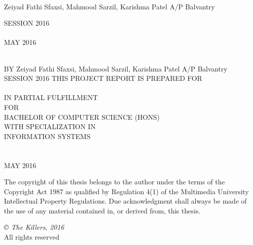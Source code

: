 \documentclass[12pt, oneside]{Thesis}
\begin{document}
\begin{titlepage}
\begin{center}

{\LARGE \ttitle}\\[0.4cm] 
\vfill
\Large{Zeiyad Fathi Sfaxsi, Mahmood Sarzil, Karishma Patel A/P Balvantry} 

\vfill
\normalsize{SESSION 2016}
\vfill
\normalsize\FACNAME\\
\normalsize \UNIVNAME\\
{\normalsize MAY 2016}\\ 
\vfill
\end{center}

\end{titlepage}
\thispagestyle{empty}
\begin{center}

	{\LARGE \ttitle}\\[0.4cm] %
	\vfill
	\footnotesize{BY}
	\vfill
	\Large{Zeiyad Fathi Sfaxsi, Mahmood Sarzil, Karishma Patel A/P Balvantry} %
	\vfill
	\footnotesize{SESSION 2016}
	\vfill
	\footnotesize{THIS PROJECT REPORT IS PREPARED FOR}
	\vfil
	\normalsize\FACNAME\\
	\normalsize \UNIVNAME\\
	\normalsize{IN PARTIAL FULFILLMENT}\\
	\normalsize{FOR}\\
	\vfil
	\normalsize{BACHELOR OF COMPUTER SCIENCE (HONS)}\\
	\normalsize{WITH SPECIALIZATION IN}\\
	\normalsize{INFORMATION SYSTEMS}\\
	\vfil
	\normalsize\FACNAME\\
	\vfil
	\Large \UNIVNAME\\
	\vfil
	{\normalsize MAY 2016}\\ %
	\vfill
\end{center}

\newpage
\thispagestyle{empty}

The copyright of this thesis belongs to the author under the terms of the Copyright Act 1987 as qualified by Regulation 4(1) of the Multimedia University Intellectual Property Regulations. Due acknowledgment shall always be made of the use of any material contained in, or derived from, this thesis. 

\vfil
\textit{© The Killers, 2016}\\
All rights reserved
\end{document}
